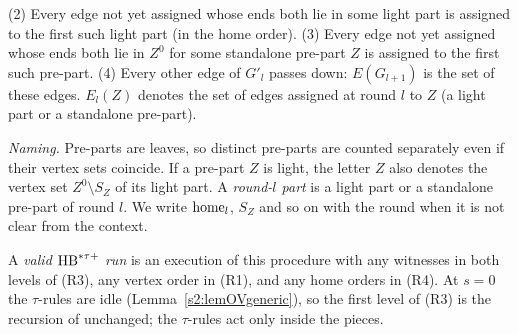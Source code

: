 \begin{definition}
\begin{enumerate}
(2) Every edge not yet assigned whose ends both lie in some light part is
assigned to the first such light part (in the home order).
(3) Every edge not yet assigned whose ends both lie in $Z^0$ for some
standalone pre-part $Z$ is assigned to the first such pre-part.
(4) Every other edge of $G'_l$ passes down: $E(G_{l+1})$ is the set of these
edges.
$E_l(Z)$ denotes the set of edges assigned at round $l$ to $Z$ (a light part or
a standalone pre-part).
\end{enumerate}
\emph{Naming.} Pre-parts are leaves, so distinct pre-parts are counted
separately even if their vertex sets coincide. If a pre-part $Z$ is light, the
letter $Z$ also denotes the vertex set $Z^0\setminus S_Z$ of its light part.
A \emph{round-$l$ part} is a light part or a standalone pre-part of round $l$.
We write $\mathrm{home}_l$, $S_Z$ and so on with the round when it is not clear from
the context.

A \emph{valid $\mathrm{HB}^{*\tau{+}}$ run} is an execution of this procedure with any
witnesses in both levels of (R3), any vertex order in (R1), and any home
orders in (R4). At $s=0$ the $\tau$-rules are idle
(Lemma~\ref{s2:lemOVgeneric}), so the first level of (R3) is the recursion
of \cite{BM} unchanged; the $\tau$-rules act only inside the pieces.
\deps{\ref{s1:citLem14}, \ref{s2:lem14tau}, \ref{s1:defConstants}, \ref{s2:lemOVgeneric}, \ref{s2:lemSEP}}
\end{definition}

